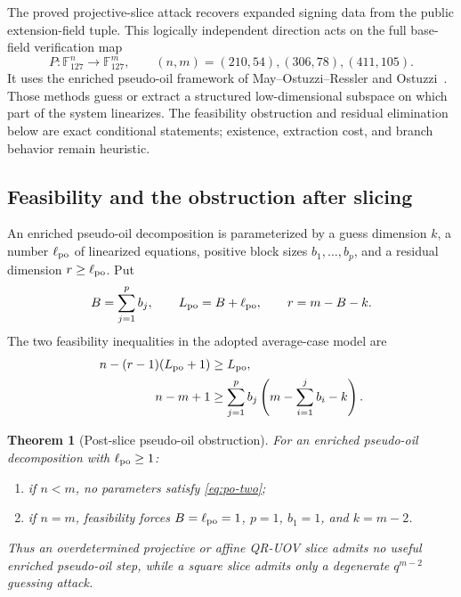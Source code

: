 \documentclass[10pt,a4paper]{article}
\newtheorem{theorem}{Theorem}[section]
\newcommand{\F}{\mathbb F}
\begin{document}
\begin{center}
\end{center}

The proved projective-slice attack recovers expanded signing data from the public extension-field tuple.  This logically independent direction acts on the full base-field verification map
\[
P:\F_{127}^{n}\longrightarrow\F_{127}^{m},
\qquad
(n,m)=(210,54),(306,78),(411,105).
\]
It uses the enriched pseudo-oil framework of May--Ostuzzi--Ressler and Ostuzzi~\cite{JustGuess,Ostuzzi}.  Those methods guess or extract a structured low-dimensional subspace on which part of the system linearizes.  The feasibility obstruction and residual elimination below are exact conditional statements; existence, extraction cost, and branch behavior remain heuristic.


\subsection{Feasibility and the obstruction after slicing}

An enriched pseudo-oil decomposition is parameterized by a guess dimension $k$, a number $\ell_{\rm po}$ of linearized equations, positive block sizes $b_1,\ldots,b_p$, and a residual dimension $r\ge\ell_{\rm po}$.  Put
\[
B=\sum_{j=1}^p b_j,
\qquad
L_{\rm po}=B+\ell_{\rm po},
\qquad
r=m-B-k.
\]
The two feasibility inequalities in the adopted average-case model are
\begin{align}
 n-(r-1)(L_{\rm po}+1)&\ge L_{\rm po},\label{eq:po-one}\\
 n-m+1&\ge\sum_{j=1}^p b_j\left(m-\sum_{i=1}^j b_i-k\right).\label{eq:po-two}
\end{align}

\begin{theorem}[Post-slice pseudo-oil obstruction]\label{thm:po-obstruction}
For an enriched pseudo-oil decomposition with $\ell_{\rm po}\ge1$:
\begin{enumerate}
\item if $n<m$, no parameters satisfy \eqref{eq:po-two};
\item if $n=m$, feasibility forces $B=\ell_{\rm po}=1$, $p=1$, $b_1=1$, and $k=m-2$.
\end{enumerate}
Thus an overdetermined projective or affine QR-UOV slice admits no useful enriched pseudo-oil step, while a square slice admits only a degenerate $q^{m-2}$ guessing attack.
\end{theorem}
\end{document}
